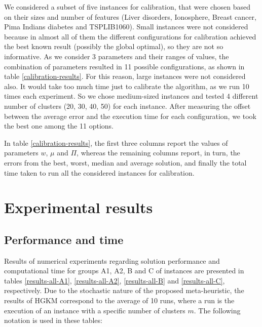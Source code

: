 We considered a subset of five instances for calibration, that were chosen based on their sizes and number of features (Liver disorders, Ionosphere, Breast cancer, Pima Indians diabetes and TSPLIB1060). Small instances were not considered because in almost all of them the different configurations for calibration achieved the best known result (possibly the global optimal), so they are not so informative. As we consider 3 parameters and their ranges of values, the combination of parameters resulted in 11 possible configurations, as shown in table \ref{calibration-results}. For this reason, large instances were not considered also. It would take too much time just to calibrate the algorithm, as we run 10 times each experiment. So we chose medium-sized instances and tested 4 different number of clusters (20, 30, 40, 50) for each instance. After measuring the offset between the average error and the execution time for each configuration, we took the best one among the 11 options.

In table \ref{calibration-results}, the first three columns report the values of parameters $w$, $\mu$ and $\Pi$, whereas the remaining columns report, in turn, the errors from the best, worst, median and average solution, and finally the total time taken to run all the considered instances for calibration.



\section{Experimental results}
\label{sec:results}

\subsection{Performance and time}
Results of numerical experiments regarding solution performance and computational time for groups A1, A2, B and C of instances are presented in tables \ref{results-all-A1}, \ref{results-all-A2}, \ref{results-all-B} and \ref{results-all-C}, respectively. Due to the stochastic nature of the proposed meta-heuristic, the results of HGKM correspond to the average of 10 runs, where a run is the execution of an instance with a specific number of clusters $m$. The following notation is used in these tables:

